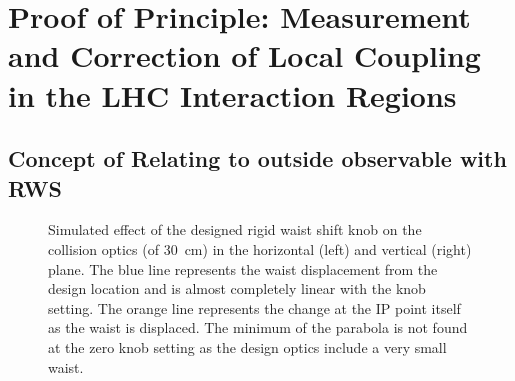 

\section{Proof of Principle: Measurement and Correction of Local Coupling in the LHC Interaction Regions}

\subsection{Concept of Relating to outside observable with RWS}

\begin{figure}[htp]
    \centering
    \hspace{0.3cm}
    \caption{Simulated effect of the designed rigid waist shift knob on the collision optics (\betastar of \qty{30}{\centi\metre}) in the horizontal (left) and vertical (right) plane. The blue line represents the waist displacement from the design location and is almost completely linear with the knob setting. The orange line represents the \betafunction change at the IP point itself as the waist is displaced. The minimum of the parabola is not found at the zero knob setting as the design optics include a very small waist.}
    \label{fig:rigid_waist_shift_knob_effect}
\end{figure}

